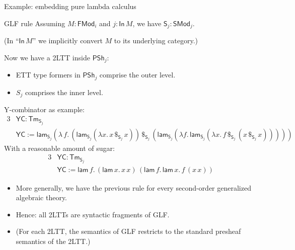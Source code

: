 \documentclass[dvipsnames,aspectratio=169]{beamer}
\newcommand{\ms}[1]{\mathsf{#1}}
\newcommand{\Tm}{\mathsf{Tm}}
\newcommand{\In}{\mathsf{In}}
\newcommand{\PSh}{\mathsf{PSh}}
\newcommand{\SMod}{\mathsf{SMod}}
\newcommand{\FMod}{\mathsf{FMod}}
\renewcommand{\S}{\mathsf{S}}
\newcommand{\lam}{\ms{lam}}
\begin{document}
\begin{frame}{Example: embedding pure lambda calculus}

\begin{block}{GLF rule}
  Assuming $M : \FMod_i$ and $j : \In\,M$, we have $\S_j : \SMod_j$.

  {\footnotesize (In ``$\In\,M$'' we implicitly convert $M$ to its underlying category.)}
\end{block}
\vspace{0.5em}

Now we have a 2LTT inside $\PSh_j$:
\begin{itemize}
\item ETT type formers in $\PSh_j$ comprise the outer level.
\item $S_j$ comprises the inner level.
\end{itemize}
\vspace{0.5em}
\pause
Y-combinator as example:
\begin{alignat*}{3}
  & \ms{YC} : \Tm_{\S_j} \\
  & \ms{YC} := \lam_{\S_j}(\lambda\,f.\,(\lam_{\S_j} (\lambda x.\, x\,\$_{\S_j}\,x))\,\$_{\S_j}\,
               (\lam_{\S_j} (\lambda f.\,\lam_{\S_j} (\lambda x.\, f \,\$_{\S_j}\, (x \,\$_{\S_j}\, x)))))
\end{alignat*}
\pause
With a reasonable amount of sugar:
\begin{alignat*}{3}
  & \ms{YC} : \Tm_{\S_j} \\
  & \ms{YC} := \lam\,f.\,(\lam\,x.\,x\,x)\,(\lam\,f.\,\lam\,x.\,f\,(x\,x))
\end{alignat*}

\end{frame}

\begin{frame}{}

\begin{itemize}
\item More generally, we have the previous rule for every second-order generalized algebraic theory.
\pause
\item Hence: all 2LTTs are syntactic fragments of GLF.
\pause
\item (For each 2LTT, the semantics of GLF restricts to the standard presheaf semantics of the 2LTT.)
\end{itemize}


\end{frame}
\end{document}
